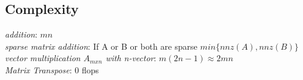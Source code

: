 \subsection{Complexity}
\textit{addition}: $mn$\\
\textit{sparse matrix addition}: If A or B or both are sparse $min\{nnz(A), nnz(B)\}$\\
\textit{vector multiplication $A_{mxn}$ with n-vector}: $m(2n-1) \approx 2mn$\\
\textit{Matrix Transpose}: 0 flops